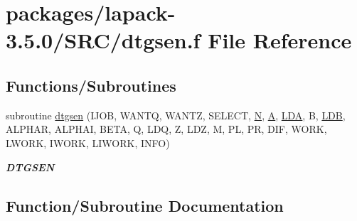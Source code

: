 \hypertarget{dtgsen_8f}{}\section{packages/lapack-\/3.5.0/\+S\+R\+C/dtgsen.f File Reference}
\label{dtgsen_8f}
\subsection*{Functions/\+Subroutines}
\begin{DoxyCompactItemize}
\item 
subroutine \hyperlink{dtgsen_8f_aba8441d4f7374bbcf6c093dbec0b517e}{dtgsen} (I\+J\+O\+B, W\+A\+N\+T\+Q, W\+A\+N\+T\+Z, S\+E\+L\+E\+C\+T, \hyperlink{polmisc_8c_a0240ac851181b84ac374872dc5434ee4}{N}, \hyperlink{classA}{A}, \hyperlink{example__user_8c_ae946da542ce0db94dced19b2ecefd1aa}{L\+D\+A}, B, \hyperlink{example__user_8c_a50e90a7104df172b5a89a06c47fcca04}{L\+D\+B}, A\+L\+P\+H\+A\+R, A\+L\+P\+H\+A\+I, B\+E\+T\+A, Q, L\+D\+Q, Z, L\+D\+Z, M, P\+L, P\+R, D\+I\+F, W\+O\+R\+K, L\+W\+O\+R\+K, I\+W\+O\+R\+K, L\+I\+W\+O\+R\+K, I\+N\+F\+O)
\begin{DoxyCompactList}\small\item\em {\bfseries D\+T\+G\+S\+E\+N} \end{DoxyCompactList}\end{DoxyCompactItemize}


\subsection{Function/\+Subroutine Documentation}
\hypertarget{dtgsen_8f_aba8441d4f7374bbcf6c093dbec0b517e}{}
